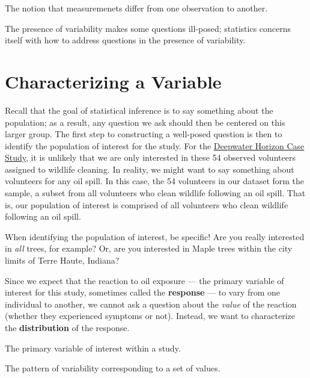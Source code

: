 \documentclass[]{book}
\theoremstyle{definition}
\theoremstyle{definition}
\theoremstyle{remark}
\let\BeginKnitrBlock\begin \let\EndKnitrBlock\end
\begin{document}
\BeginKnitrBlock{definition}[Variability]
\protect\hypertarget{def:defn-variability}{}{\label{def:defn-variability}
{} }The notion that measuremenets differ from
one observation to another.
\EndKnitrBlock{definition}

\BeginKnitrBlock{rmdkeyidea}
The presence of variability makes some questions ill-posed; statistics
concerns itself with how to address questions in the presence of
variability.
\EndKnitrBlock{rmdkeyidea}

\section{Characterizing a Variable}\label{characterizing-a-variable}

Recall that the goal of statistical inference is to say something about
the population; as a result, any question we ask should then be centered
on this larger group. The first step to constructing a well-posed
question is then to identify the population of interest for the study.
For the \protect\hyperlink{CaseDeepwater}{Deepwater Horizon Case Study},
it is unlikely that we are only interested in these 54 observed
volunteers assigned to wildlife cleaning. In reality, we might want to
say something about volunteers for any oil spill. In this case, the 54
volunteers in our dataset form the sample, a subset from all volunteers
who clean wildlife following an oil spill. That is, our population of
interest is comprised of all volunteers who clean wildlife following an
oil spill.

\BeginKnitrBlock{rmdtip}
When identifying the population of interest, be specific! Are you really
interested in \emph{all} trees, for example? Or, are you interested in
Maple trees within the city limits of Terre Haute, Indiana?
\EndKnitrBlock{rmdtip}

Since we expect that the reaction to oil exposure --- the primary
variable of interest for this study, sometimes called the
\textbf{response} --- to vary from one individual to another, we cannot
ask a question about the \emph{value} of the reaction (whether they
experienced symptoms or not). Instead, we want to characterize the
\textbf{distribution} of the response.

\BeginKnitrBlock{definition}[Response]
\protect\hypertarget{def:defn-response}{}{\label{def:defn-response}
{} }The primary variable of interest within a
study.
\EndKnitrBlock{definition}

\BeginKnitrBlock{definition}[Distribution]
\protect\hypertarget{def:defn-distribution}{}{\label{def:defn-distribution}
{} }The pattern of variability corresponding
to a set of values.
\EndKnitrBlock{definition}
\end{document}
